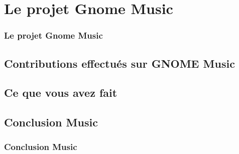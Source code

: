 \documentclass{beamer}
\begin{document}
\section{Le projet Gnome Music}
\begin{frame}
  \frametitle{Le projet Gnome Music}
\end{frame}

\subsection{Contributions effectués sur GNOME Music}
\subsection{Ce que vous avez fait}
\begin{frame}
  \frametitle{}
\end{frame}

\subsection{Conclusion Music}
\begin{frame}
  \frametitle{Conclusion Music}
\end{frame}
\end{document}
